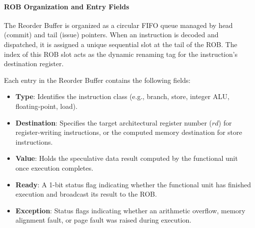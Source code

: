 \paragraph{ROB Organization and Entry Fields}
The Reorder Buffer is organized as a circular FIFO queue managed by head (commit) and tail (issue) pointers. When an instruction is decoded and dispatched, it is assigned a unique sequential slot at the tail of the ROB. The index of this ROB slot acts as the dynamic renaming tag for the instruction's destination register. 

Each entry in the Reorder Buffer contains the following fields:
\begin{itemize}
    \item \textbf{Type}: Identifies the instruction class (e.g., branch, store, integer ALU, floating-point, load).
    \item \textbf{Destination}: Specifies the target architectural register number ($rd$) for register-writing instructions, or the computed memory destination for store instructions.
    \item \textbf{Value}: Holds the speculative data result computed by the functional unit once execution completes.
    \item \textbf{Ready}: A 1-bit status flag indicating whether the functional unit has finished execution and broadcast its result to the ROB.
    \item \textbf{Exception}: Status flags indicating whether an arithmetic overflow, memory alignment fault, or page fault was raised during execution.
\end{itemize}

